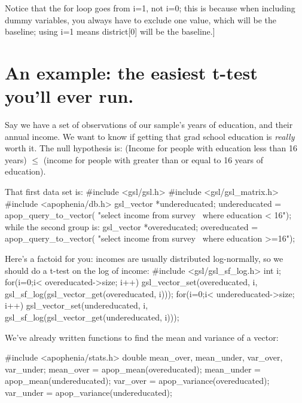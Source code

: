 Notice that the for loop goes from i=1, not i=0; this is because when including
dummy variables, you always have to exclude one value, which will be the baseline;
using i=1 means district[0] will be the baseline.]




\section{An example: the easiest t-test you'll ever run.}
Say we have a set of observations of our sample's years of education, and their annual income. We want to
know if getting that grad school education is {\it really} worth it. The null hypothesis is: (Income for
people with education less than 16 years) $\leq$ (income for people with greater than or equal to 16 years
of education).

That first data set is:
#include <gsl/gsl.h>
#include <gsl/gsl_matrix.h>
#include <apophenia/db.h>
gsl_vector	*undereducated;
   undereducated = apop_query_to_vector(
      "select income from survey \
      where education < 16");
while the second group is:
gsl_vector	*overeducated;
   overeducated = apop_query_to_vector(
      "select income from survey \
      where education >=16");

Here's a factoid for you: incomes are usually distributed log-normally, so we should do a t-test on the
log of income:
#include <gsl/gsl_sf_log.h>
int i;
for(i=0;i< overeducated->size; i++)
   gsl_vector_set(overeducated, i, 
               gsl_sf_log(gsl_vector_get(overeducated, i)));
for(i=0;i< undereducated->size; i++)
   gsl_vector_set(undereducated, i, 
               gsl_sf_log(gsl_vector_get(undereducated, i)));

We've already written functions to find the mean and variance of a vector:

#include <apophenia/stats.h>
double	mean_over, mean_under, var_over, var_under;
mean_over  = apop_mean(overeducated);
mean_under = apop_mean(undereducated);
var_over   = apop_variance(overeducated);
var_under  = apop_variance(undereducated);

